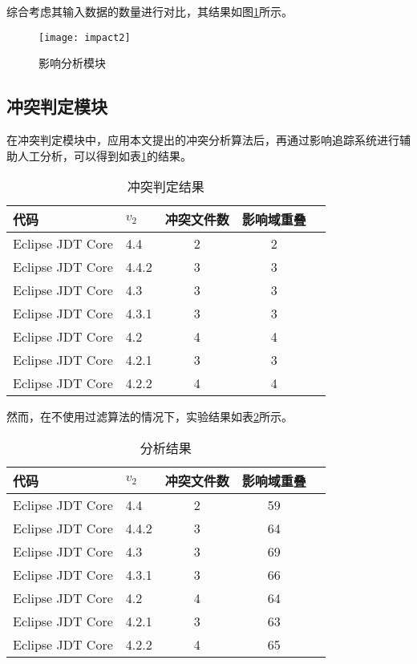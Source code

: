 综合考虑其输入数据的数量进行对比，其结果如图\ref {impact2}所示。

\begin{figure}[H]
	\centering
	\texttt{[image: impact2]}
	\caption {影响分析模块}
	\label {impact2}	
\end{figure}


\subsection{冲突判定模块}

在冲突判定模块中，应用本文提出的冲突分析算法后，再通过影响追踪系统进行辅助人工分析，可以得到如表\ref {data_compatible}的结果。

\begin{table}[H]
	\caption{冲突判定结果}
	\label{data_compatible}
	\centering
	\begin{tabular}{llccc}
		\toprule[1.5pt]
		{\heiti 代码} & {\heiti $v_2$} & {\heiti 冲突文件数} & {\heiti 影响域重叠}  \\\midrule[1pt]
		Eclipse JDT Core & 4.4 	& 2 & 2 \\
		Eclipse JDT Core & 4.4.2 & 3 & 3 \\
		Eclipse JDT Core & 4.3 	& 3 & 3 \\
		Eclipse JDT Core & 4.3.1 & 3 & 3 \\
		Eclipse JDT Core & 4.2 	& 4 & 4 \\
		Eclipse JDT Core & 4.2.1 & 3  &	3 \\
		Eclipse JDT Core & 4.2.2 & 4 & 4 \\
		\bottomrule[1.5pt]
	\end{tabular}
\end{table}

然而，在不使用过滤算法的情况下，实验结果如表\ref {data_compatible_2}所示。

\begin{table}[H]
	\caption{分析结果}
	\label{data_compatible_2}
	\centering
	\begin{tabular}{llccc}
		\toprule[1.5pt]
		{\heiti 代码} & {\heiti $v_2$} & {\heiti 冲突文件数} & {\heiti 影响域重叠} \\\midrule[1pt]
		Eclipse JDT Core & 4.4 	& 2 & 59 \\
		Eclipse JDT Core & 4.4.2 & 3 & 64 \\
		Eclipse JDT Core & 4.3 	& 3 & 69 \\
		Eclipse JDT Core & 4.3.1 & 3 & 66 \\
		Eclipse JDT Core & 4.2 	& 4 & 64 \\
		Eclipse JDT Core & 4.2.1 & 3 & 63 \\
		Eclipse JDT Core & 4.2.2 & 4 & 65 \\
		\bottomrule[1.5pt]
	\end{tabular}
\end{table}

